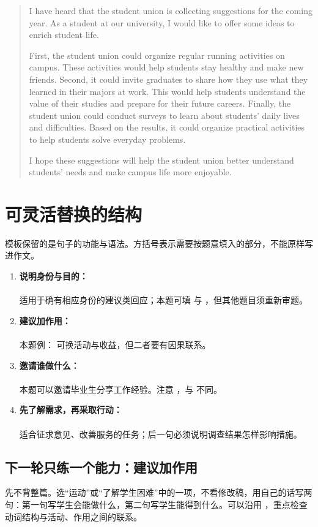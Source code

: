 \begin{quote}
I have heard that the student union is collecting suggestions for the coming year. As a student at our university, I would like to offer some ideas to enrich student life.

First, the student union could organize regular running activities on campus. These activities would help students stay healthy and make new friends. Second, it could invite graduates to share how they use what they learned in their majors at work. This would help students understand the value of their studies and prepare for their future careers. Finally, the student union could conduct surveys to learn about students' daily lives and difficulties. Based on the results, it could organize practical activities to help students solve everyday problems.

I hope these suggestions will help the student union better understand students' needs and make campus life more enjoyable.
\end{quote}

\section{可灵活替换的结构}
模板保留的是句子的功能与语法。方括号表示需要按题意填入的部分，不能原样写进作文。

\begin{enumerate}
\item \textbf{说明身份与目的：}\\
\\
适用于确有相应身份的建议类回应；本题可填  与 ，但其他题目须重新审题。
\item \textbf{建议加作用：}\\
\\
本题例： 可换活动与收益，但二者要有因果联系。
\item \textbf{邀请谁做什么：}\\
\\
本题可以邀请毕业生分享工作经验。注意 ，与  不同。
\item \textbf{先了解需求，再采取行动：}\\
\\
适合征求意见、改善服务的任务；后一句必须说明调查结果怎样影响措施。
\end{enumerate}

\subsection{下一轮只练一个能力：建议加作用}
先不背整篇。选“运动”或“了解学生困难”中的一项，不看修改稿，用自己的话写两句：第一句写学生会能做什么，第二句写学生能得到什么。可以沿用 ，重点检查动词结构与活动、作用之间的联系。
